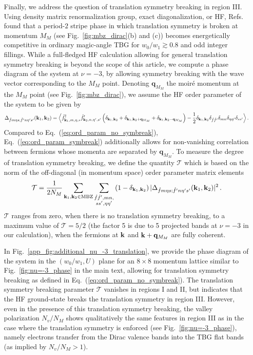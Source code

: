 \documentclass[prb,aps,nofootinbib,amssymb,twocolumn,superscriptaddress,10pt]{revtex4-2}
\begin{document}
\begin{widetext}
Finally, we address the question of translation symmetry breaking in region III. Using density matrix renormalization group, exact diagonalization, or HF, Refs.~\cite{KAN20a,SOE20,XIE20a} found that a period-$2$ stripe phase in which translation symmetry is broken at momentum $M_M$ (see Fig.~\ref{fig:mbz_dirac}(b) and (c)) becomes energetically competitive in ordinary magic-angle TBG for $w_0/w_1 \gtrsim 0.8$ and odd integer fillings.
While a full-fledged HF calculation allowing for general translation symmetry breaking is beyond the scope of this article, we compute a phase diagram of the system at $\nu = -3$, by allowing symmetry breaking with the wave vector corresponding to the $M_M$ point. Denoting $\mathbf{q}_{M_M}$ the moir\'e momentum at the $M_M$ point (see Fig.~\ref{fig:mbz_dirac}), we assume the HF order parameter of the system to be given by 
\begin{equation}
    \label{eq:ord_param_symbreak}
	\Delta_{\hat{f}m\eta s; \hat{f}'n\eta's'}(\mathbf{k}_1,\mathbf{k}_2) = \Big{\langle} \hat{f}^\dagger_{\mathbf{k}_1,m,\eta,s}\hat{f}'_{\mathbf{k}_2,n,\eta',s'} \left(\delta_{\mathbf{k}_1,\mathbf{k}_2} + \delta_{\mathbf{k}_1,\mathbf{k}_2 + \mathbf{q}_{M_M}} + \delta_{\mathbf{k}_1,\mathbf{k}_2 - \mathbf{q}_{M_M}} \right) - \frac12 \delta_{\mathbf{k}_1,\mathbf{k}_2}\delta_{\hat{f}\hat{f}'}\delta_{mn}\delta_{\eta\eta'}\delta_{ss'} \Big{\rangle}\,.
\end{equation}
Compared to Eq.~(\ref{eq:ord_param_no_symbreak}),  Eq.~(\ref{eq:ord_param_symbreak}) additionally allows for non-vanishing correlation between fermions whose momenta are separated by $\mathbf{q}_{M_M}$. To measure the degree of translation symmetry breaking, we define the quantity $\mathcal{T}$ which is based on the norm of the off-diagonal (in momentum space) order parameter matrix elements 
\begin{equation}
    \mathcal{T} = \frac{1}{2 N_M}\sum_{\mathbf{k}_1 , \mathbf{k}_2 \in{\rm MBZ}}\sum_{\substack{\hat{f}\hat{f}',mn, \\ ss',\eta\eta'}} \left(1-\delta_{\mathbf{k}_1,\mathbf{k}_2} \right) |\Delta_{\hat{f}m\eta s;\hat{f}'n\eta' s'}(\mathbf{k}_1,\mathbf{k}_2)|^2 \,.\label{eq:definitionT}
\end{equation}
$\mathcal{T}$ ranges from zero, when there is no translation symmetry breaking, to a maximum value of $\mathcal{T} = 5/2$ (the factor 5 is due to 5 projected bands at $\nu=-3$ in our calculation), when the fermions at $\mathbf{k}$ and $\mathbf{k} + \mathbf{q}_{M_M}$ are fully coherent.

In Fig.~\ref{app_fig:additional_nu_-3_translation}, we provide the phase diagram of the system in the $(w_0/w_1, U)$ plane for an $8 \times 8$ momentum lattice similar to Fig.~\ref{fig:nu=-3_phase} in the main text, allowing for translation symmetry breaking as defined in Eq.~(\ref{eq:ord_param_no_symbreak}). The translation symmetry breaking parameter $\mathcal{T}$ vanishes in regions I and II, but indicates that the HF ground-state breaks the translation symmetry in region III. However, even in the presence of this translation symmetry breaking, the valley polarization $N_v /N_M$ shows qualitatively the same features in region III as in the case where the translation symmetry is enforced (see Fig.~\ref{fig:nu=-3_phase}), namely electrons transfer from the Dirac valence bands into the TBG flat bands (as implied by $N_v/N_M > 1$).


\end{widetext}
\end{document}
